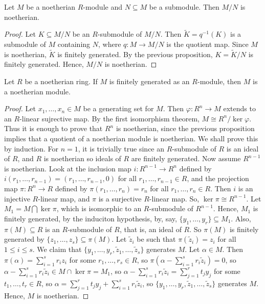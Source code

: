 \begin{proposition}
    Let $M$ be a noetherian $R$-module and $N \subseteq M$ be a submodule. Then $M/N$ is noetherian.
\end{proposition}

\begin{proof}
    Let $K \subseteq M/N$ be an $R$-submodule of $M/N$. Then $\tilde{K} = q^{-1}(K)$ is a submodule of $M$ containing $N$, where $q : M \to M/N$ is the quotient map. Since $M$ is noetherian, $\tilde{K}$ is finitely generated. By the previous proposition, $K = \tilde{K}/N$ is finitely generated. Hence, $M/N$ is noetherian. 
\end{proof}

\begin{theorem}
    Let $R$ be a noetherian ring. If $M$ is finitely generated as an $R$-module, then $M$ is a noetherian module.
\end{theorem}

\begin{proof}
    Let $x_{1},\ldots,x_{n} \in M$ be a generating set for $M$. Then $\varphi: R^{n} \to M$ extends to an $R$-linear sujrective map. By the first isomorphism theorem, $M \cong R^{n} / \ker \varphi$. Thus it is enough to prove that $R^{n}$ is noetherian, since the previous proposition implies that a quotient of a noetherian module is noetherian. We shall prove this by induction. For $n = 1$, it is trivially true since an $R$-submodule of $R$ is an ideal of $R$, and $R$ is noetherian so ideals of $R$ are finitely generated. Now assume $R^{n-1}$ is noetherian. Look at the inclusion map $i:R^{n-1} \to R^{n}$ defined by $i(r_{1},\ldots,r_{n-1}) = (r_{1},\ldots,r_{n-1},0)$ for all $r_{1},\ldots,r_{n-1} \in R$, and the projection map $\pi:R^{n} \to R$ defined by $\pi(r_{1},\ldots,r_{n}) = r_{n}$ for all $r_{1},\ldots,r_{n} \in R$. Then $i$ is an injective $R$-linear map, and $\pi$ is a surjective $R$-linear map. So, $\ker \pi \cong R^{n-1}$. Let $M_{1} = M \bigcap \ker \pi$, which is isomorphic to an $R$-submodule of $R^{n-1}$. Hence, $M_{1}$ is finitely generated, by the induciton hypothesis, by, say, $\{y_{1},\ldots,y_{r}\} \subseteq M_{1}$. Also, $\pi(M) \subseteq R$ is an $R$-submodule of $R$, that is, an ideal of $R$. So $\pi(M)$ is finitely generated by $\{z_{1},\ldots,z_{s}\} \subseteq \pi(M)$. Let $\tilde{z}_{i}$ be such that $\pi(\tilde{z}_{i}) = z_{i}$ for all $1 \leq i \leq s$. We claim that $\{y_{1},\ldots,y_{r},\tilde{z}_{1},\ldots,\tilde{z}_{s}\}$ generates $M$. Let $\alpha \in M$. Then $\pi(\alpha) = \sum_{i=1}^{s} r_{i}z_{i}$ for some $r_{1},\ldots,r_{s} \in R$, so $\pi(\alpha - \sum_{i=1}^{s} r_{i}\tilde{z}_{i}) = 0$, so $\alpha - \sum_{i=1}^{s} r_{i}\tilde{z}_{i} \in M \cap \ker \pi = M_{1}$, so $\alpha - \sum_{i=1}^{s} r_{i}\tilde{z}_{i} = \sum_{j=1}^{r} t_{j}y_{j}$ for some $t_{1},\ldots,t_{r} \in R$, so $\alpha = \sum_{j=1}^{r} t_{j}y_{j} + \sum_{i=1}^{s} r_{i}\tilde{z}_{i}$, so $\{y_{1},\ldots,y_{r},\tilde{z}_{1},\ldots,\tilde{z}_{s}\}$ generates $M$. Hence, $M$ is noetherian.
\end{proof}

